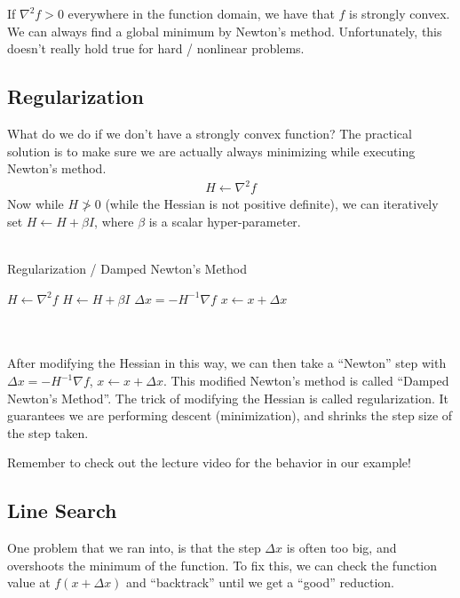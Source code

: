 \noindent
If $\nabla^2 f > 0$ everywhere in the function domain, we have that $f$ is strongly convex. We can always find a global minimum by Newton's method. Unfortunately, this doesn't really hold true for hard / nonlinear problems. 

\subsection{Regularization}
What do we do if we don't have a strongly convex function? The practical solution is to make sure we are actually always minimizing while executing Newton's method. 
\begin{align}
    H \gets \nabla^2 f
\end{align}
Now while $H \not> 0$  (while the Hessian is not positive definite), we can iteratively set $H \gets H+\beta I$, where $\beta$ is a scalar hyper-parameter. 
\\
\\
\noindent
\begin{algorithm}
	\caption{Regularization / Damped Newton's Method}
	\label{alg:regularization}
	\begin{algorithmic}[1]	
        \State $H \gets \nabla^2 f$ 
         
            \State $H \gets H + \beta I$ 
        \EndWhile
        \State $\Delta x = -H^{-1} \nabla f$
        \State $x \gets x + \Delta x$
	\end{algorithmic}
\end{algorithm}
\\
\\

After modifying the Hessian in this way, we can then take a ``Newton'' step with $\Delta x = - H^{-1} \nabla f$, $x \gets x + \Delta x$. This modified Newton's method is called ``Damped Newton's Method''. The trick of modifying the Hessian is called regularization. It guarantees we are performing descent (minimization), and shrinks the step size of the step taken.

\noindent
Remember to check out the lecture video for the behavior in our example! 

\subsection{Line Search}
One problem that we ran into, is that the step $\Delta x$ is often too big, and overshoots the minimum of the function. To fix this, we can check the function value at $f(x + \Delta x)$ and ``backtrack'' until we get a ``good'' reduction.

